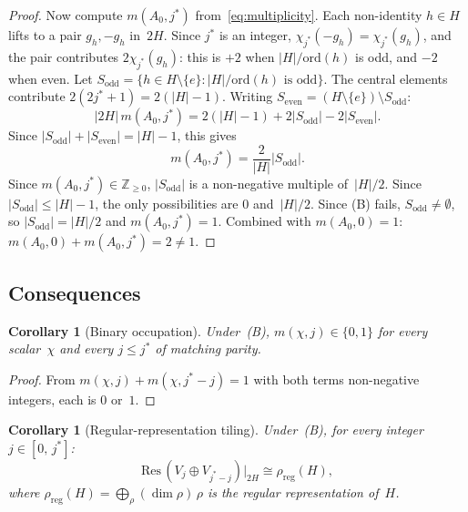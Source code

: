 \documentclass[12pt]{article}
\newtheorem{corollary}[theorem]{Corollary}
\theoremstyle{definition}
\theoremstyle{remark}
\newcommand{\ZZ}{\mathbb{Z}}
\begin{document}
\begin{proof}
  Now compute $m(A_0, j^*)$ from~\eqref{eq:multiplicity}.
  Each non-identity $h \in H$ lifts to a pair
  $g_h, -g_h$ in~$2H$.
  Since $j^*$ is an integer,
  $\chi_{j^*}(-g_h) = \chi_{j^*}(g_h)$, and the pair
  contributes $2\chi_{j^*}(g_h)$: this is $+2$ when
  $|H|/\mathrm{ord}(h)$ is odd, and $-2$ when even.
  Let $S_{\mathrm{odd}} = \{h \in H\setminus\{e\} : |H|/\mathrm{ord}(h)
  \text{ is odd}\}$.
  The central elements contribute
  $2(2j^*{+}1) = 2(|H|{-}1)$.
  Writing $S_{\mathrm{even}} = (H\setminus\{e\})
  \setminus S_{\mathrm{odd}}$:
  \[
    |2H|\,m(A_0, j^*)
    = 2(|H|{-}1)
    + 2|S_{\mathrm{odd}}|
    - 2|S_{\mathrm{even}}|.
  \]
  Since $|S_{\mathrm{odd}}| + |S_{\mathrm{even}}| = |H|{-}1$,
  this gives
  \begin{equation}
    \label{eq:m-jstar}
    m(A_0, j^*)
    = \frac{2}{|H|}
      |S_{\mathrm{odd}}|.
  \end{equation}
  Since $m(A_0,j^*) \in \ZZ_{\ge 0}$,
  $|S_{\mathrm{odd}}|$ is a non-negative multiple
  of~$|H|/2$.
  Since $|S_{\mathrm{odd}}| \le |H|{-}1$, the only
  possibilities are $0$ and~$|H|/2$.
  Since (B) fails, $S_{\mathrm{odd}} \neq \emptyset$,
  so $|S_{\mathrm{odd}}| = |H|/2$ and
  $m(A_0, j^*) = 1$.
  Combined with $m(A_0, 0) = 1$:
  $m(A_0, 0) + m(A_0, j^*) = 2 \neq 1$.
\end{proof}

\subsection{Consequences}
\label{sec:consequences}

\begin{corollary}[Binary occupation]
  \label{cor:binary}
  Under~\textup{(B)}, $m(\chi, j) \in \{0,1\}$ for every
  scalar~$\chi$ and every $j \le j^*$ of matching parity.
\end{corollary}

\begin{proof}
  From $m(\chi,j) + m(\chi,j^*{-}j) = 1$ with both terms
  non-negative integers, each is $0$ or~$1$.
\end{proof}

\begin{corollary}[Regular-representation tiling]
  \label{cor:reg-rep}
  Under~\textup{(B)}, for every integer $j \in [0,\, j^*]$:
  \begin{equation}
    \label{eq:reg-rep-tiling}
    \mathrm{Res}\,(V_j \oplus V_{j^*-j})\big|_{2H}
    \cong \rho_{\mathrm{reg}}(H),
  \end{equation}
  where $\rho_{\mathrm{reg}}(H) = \bigoplus_{\rho} (\dim\rho)\,\rho$
  is the regular representation of~$H$.
\end{corollary}
\end{document}
